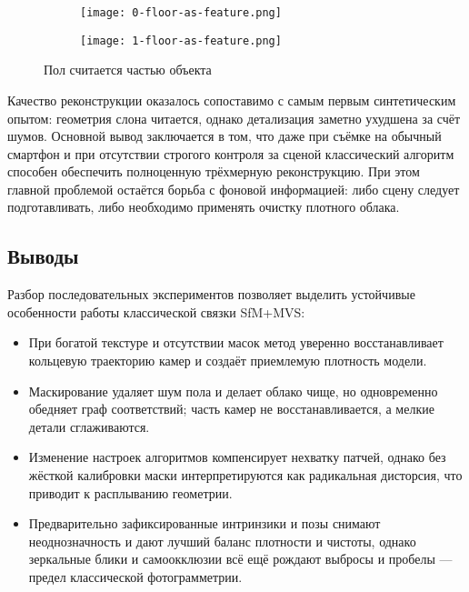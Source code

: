 \begin{figure}[h]
    \centering
    \begin{subfigure}[b]{0.2\textwidth}
        \texttt{[image: 0-floor-as-feature.png]}
    \end{subfigure}
    \begin{subfigure}[b]{0.2\textwidth}
        \texttt{[image: 1-floor-as-feature.png]}
    \end{subfigure}
    \caption{Пол считается частью объекта}
    \label{fig:floor-as-feature}
\end{figure}

Качество реконструкции оказалось сопоставимо с самым первым синтетическим
опытом: геометрия слона читается, однако детализация заметно ухудшена за счёт
шумов. Основной вывод заключается в том, что даже при съёмке на обычный смартфон
и при отсутствии строгого контроля за сценой классический алгоритм способен
обеспечить полноценную трёхмерную реконструкцию. При этом главной проблемой
остаётся борьба с фоновой информацией: либо сцену следует подготавливать, либо
необходимо применять очистку плотного облака.

\subsection{Выводы}

Разбор последовательных экспериментов позволяет выделить
устойчивые особенности работы классической связки SfM+MVS:

\begin{itemize}
    \item При богатой текстуре и отсутствии масок метод уверенно восстанавливает
    кольцевую траекторию камер и создаёт приемлемую плотность модели.

    \item Маскирование удаляет шум пола и делает облако чище, но одновременно
    обедняет граф соответствий; часть камер не восстанавливается, а мелкие
    детали сглаживаются.

    \item Изменение настроек алгоритмов компенсирует нехватку патчей,
    однако без жёсткой калибровки маски интерпретируются как радикальная
    дисторсия, что приводит к расплыванию геометрии.

    \item Предварительно зафиксированные интринзики и позы снимают
    неоднозначность и дают лучший баланс плотности и чистоты, однако зеркальные
    блики и самоокклюзии всё ещё рождают выбросы и пробелы — предел классической
    фотограмметрии.
\end{itemize}

